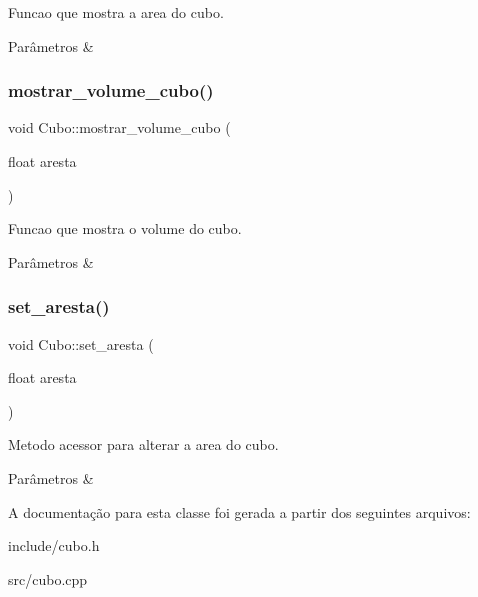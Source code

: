 Funcao que mostra a area do cubo. 


\begin{DoxyParams}{Parâmetros}
{\em } & \\
\hline
\end{DoxyParams}
\mbox{\label{classCubo_aed70c98ac76c35e48c4f2767afc39d89}} 
\subsubsection{\texorpdfstring{mostrar\+\_\+volume\+\_\+cubo()}{mostrar\_volume\_cubo()}}
{\footnotesize\ttfamily void Cubo\+::mostrar\+\_\+volume\+\_\+cubo (\begin{DoxyParamCaption}\item[{float}]{aresta }\end{DoxyParamCaption})}



Funcao que mostra o volume do cubo. 


\begin{DoxyParams}{Parâmetros}
{\em } & \\
\hline
\end{DoxyParams}
\mbox{\label{classCubo_ac23d98431874ff9f942e12abd7725141}} 
\subsubsection{\texorpdfstring{set\+\_\+aresta()}{set\_aresta()}}
{\footnotesize\ttfamily void Cubo\+::set\+\_\+aresta (\begin{DoxyParamCaption}\item[{float}]{aresta }\end{DoxyParamCaption})}



Metodo acessor para alterar a area do cubo. 


\begin{DoxyParams}{Parâmetros}
{\em } & \\
\hline
\end{DoxyParams}


A documentação para esta classe foi gerada a partir dos seguintes arquivos\+:\begin{DoxyCompactItemize}
\item 
include/cubo.\+h\item 
src/cubo.\+cpp\end{DoxyCompactItemize}

